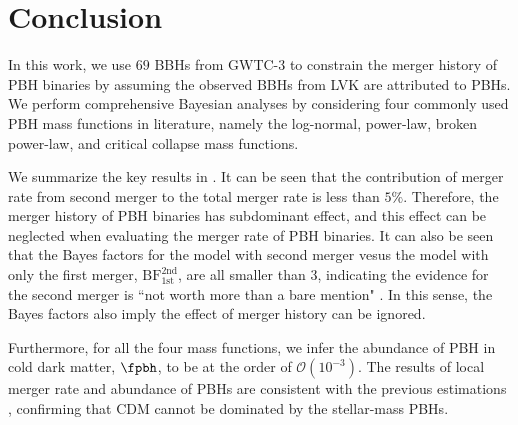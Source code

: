 \documentclass[twocolumn]{aastex631}
\begin{document}
\section{\label{conclusion}Conclusion}

In this work, we use $69$ BBHs from GWTC-3 to constrain the merger history of PBH binaries by assuming the observed BBHs from LVK are attributed to PBHs. We perform comprehensive Bayesian analyses by considering four commonly used PBH mass functions in literature, namely the log-normal, power-law, broken power-law, and critical collapse mass functions. 

We summarize the key results in . 
It can be seen that the contribution of merger rate from second merger to the total merger rate is less than $5\%$.
Therefore, the merger history of PBH binaries has subdominant effect, and this effect can be neglected  when evaluating the merger rate of PBH binaries.
It can also be seen that the Bayes factors for the model with second merger vesus the model with only the first merger, $\mathrm{BF}^{\mathrm{2nd}}_{\mathrm{1st}}$, are all smaller than $3$, indicating the evidence for the second merger is ``not worth more than a bare mention" \citep{BF}. In this sense, the Bayes factors also imply the effect of merger history can be ignored.

Furthermore, for all the four mass functions, we infer the abundance of PBH in cold dark matter, $\fpbh$, to be at the order of $\mathcal{O}(10^{-3})$. The results of local merger rate and abundance of PBHs are consistent with the previous estimations \citep{Chen:2018czv,Chen:2018rzo,Chen:2019irf,Wu:2020drm,Chen:2021nxo,Chen:2022fda}, confirming that CDM cannot be dominated by the stellar-mass PBHs. 
\end{document}

